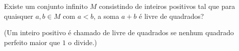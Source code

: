 Existe um conjunto infinito \(M\) consistindo de inteiros positivos tal que para quaisquer \(a,b \in M\) com \(a < b\), a soma \(a + b\) é livre de quadrados?

(Um inteiro positivo é chamado de livre de quadrados se nenhum quadrado perfeito maior que \(1\) o divide.)
